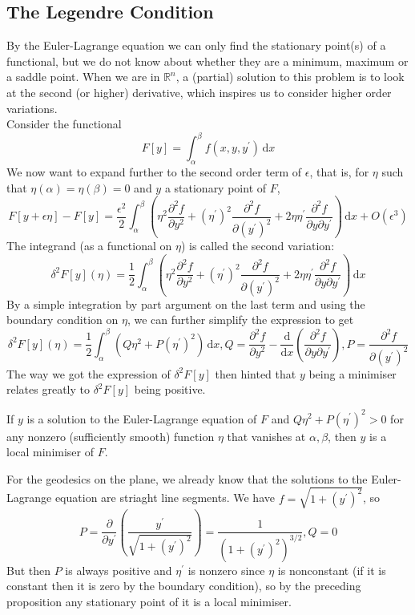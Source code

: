 \documentclass{article}
\begin{document}
\subsection{The Legendre Condition}
By the Euler-Lagrange equation we can only find the stationary point(s) of a functional, but we do not know about whether they are a minimum, maximum or a saddle point.
When we are in $\mathbb R^n$, a (partial) solution to this problem is to look at the second (or higher) derivative, which inspires us to consider higher order variations.\\
Consider the functional
$$F[y]=\int_\alpha^\beta f(x,y,y^\prime)\,\mathrm dx$$
We now want to expand further to the second order term of $\epsilon$, that is, for $\eta$ such that $\eta(\alpha)=\eta(\beta)=0$ and $y$ a stationary point of $F$,
$$F[y+\epsilon\eta]-F[y]=\frac{\epsilon^2}{2}\int_\alpha^\beta\left( \eta^2\frac{\partial^2f}{\partial y^2}+(\eta^\prime)^2\frac{\partial^2f}{\partial(y^\prime)^2}+2\eta\eta^\prime\frac{\partial^2f}{\partial y\partial y^\prime} \right)\,\mathrm dx+O(\epsilon^3)$$
The integrand (as a functional on $\eta$) is called the second variation:
$$\delta^2 F[y](\eta)=\frac{1}{2}\int_\alpha^\beta\left( \eta^2\frac{\partial^2f}{\partial y^2}+(\eta^\prime)^2\frac{\partial^2f}{\partial(y^\prime)^2}+2\eta\eta^\prime\frac{\partial^2f}{\partial y\partial y^\prime} \right)\,\mathrm dx$$
By a simple integration by part argument on the last term and using the boundary condition on $\eta$, we can further simplify the expression to get
$$\delta^2F[y](\eta)=\frac{1}{2}\int_\alpha^\beta(Q\eta^2+P(\eta^\prime)^2)\,\mathrm dx,Q=\frac{\partial^2f}{\partial y^2}-\frac{\mathrm d}{\mathrm dx}\left( \frac{\partial^2 f}{\partial y\partial y^\prime}\right),P=\frac{\partial^2f}{\partial (y^\prime)^2}$$
The way we got the expression of $\delta^2F[y]$ then hinted that $y$ being a minimiser relates greatly to $\delta^2F[y]$ being positive.
\begin{proposition}
    If $y$ is a solution to the Euler-Lagrange equation of $F$ and $Q\eta^2+P(\eta^\prime)^2>0$ for any nonzero (sufficiently smooth) function $\eta$ that vanishes at $\alpha,\beta$, then $y$ is a local minimiser of $F$.
\end{proposition}
\begin{example}
    For the geodesics on the plane, we already know that the solutions to the Euler-Lagrange equation are striaght line segments.
    We have $f=\sqrt{1+(y^\prime)^2}$, so
    $$P=\frac{\partial}{\partial y^\prime}\left( \frac{y^\prime}{\sqrt{1+(y^\prime)^2}} \right)=\frac{1}{(1+(y^\prime)^2)^{3/2}},Q=0$$
    But then $P$ is always positive and $\eta^\prime$ is nonzero since $\eta$ is nonconstant (if it is constant then it is zero by the boundary condition), so by the preceding proposition any stationary point of it is a local minimiser.
\end{example}
\end{document}
